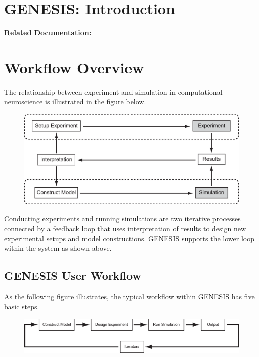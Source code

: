 \documentclass[12pt]{article}
\begin{document}
\section*{GENESIS: Introduction}

{\bf Related Documentation:}

\section*{Workflow Overview}

The relationship between experiment and simulation in computational neuroscience is illustrated in the figure below.  

 \begin{figure}[h]
    \centering
    \includegraphics[scale=0.4]{figures/Exp-Sim-8.eps}
    \label{fig:df-1}
 \end{figure}

Conducting experiments and running simulations are two iterative processes connected by a feedback loop that uses interpretation of results to design new experimental setups and model constructions. GENESIS supports the lower loop within the system as shown above.

\subsection*{GENESIS User Workflow}

As the following figure illustrates, the typical workflow within GENESIS has five basic steps. 
 \begin{figure}[h]
    \centering
    \includegraphics[scale=0.5]{figures/workflow.eps}
    \label{fig:df-1}
 \end{figure}
\end{document}
